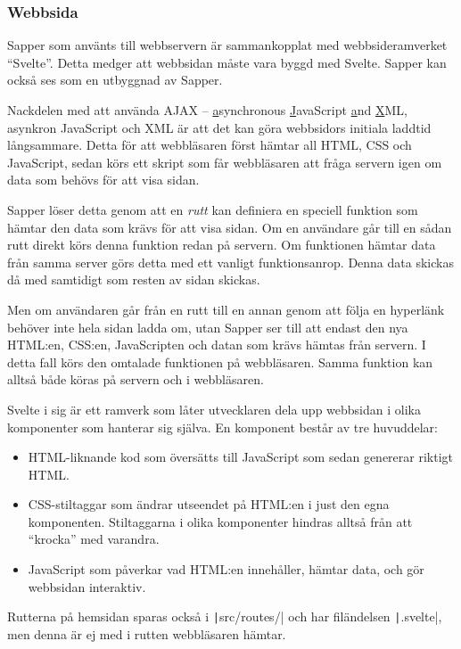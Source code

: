 \documentclass{article}
\begin{document}
\subsubsection{Webbsida}

Sapper som använts till webbservern är sammankopplat med webbsideramverket
``Svelte''. Detta medger att webbsidan måste vara byggd med Svelte. Sapper kan
också ses som en utbyggnad av Sapper.

Nackdelen med att använda AJAX \--- \underline{a}synchronous
\underline{J}avaScript \underline{a}nd \underline{X}ML, asynkron JavaScript och
XML är att det kan göra webbsidors initiala laddtid långsammare. Detta för att
webbläsaren först hämtar all HTML, CSS och JavaScript, sedan körs ett skript som
får webbläsaren att fråga servern igen om data som behövs för att visa sidan.

Sapper löser detta genom att en \textit{rutt} kan definiera en speciell funktion
som hämtar den data som krävs för att visa sidan. Om en användare går till en
sådan rutt direkt körs denna funktion redan på servern. Om funktionen hämtar
data från samma server görs detta med ett vanligt funktionsanrop. Denna data
skickas då med samtidigt som resten av sidan skickas.

Men om användaren går från en rutt till en annan genom att följa en hyperlänk
behöver inte hela sidan ladda om, utan Sapper ser till att endast den nya
HTML:en, CSS:en, JavaScripten och datan som krävs hämtas från servern. I detta
fall körs den omtalade funktionen på webbläsaren. Samma funktion kan alltså både
köras på servern och i webbläsaren.

Svelte i sig är ett ramverk som låter utvecklaren dela upp webbsidan i olika
komponenter som hanterar sig själva. En komponent består av tre huvuddelar:

\begin{itemize}
	\item HTML-liknande kod som översätts till JavaScript som sedan genererar
		riktigt HTML.
	\item CSS-stiltaggar som ändrar utseendet på HTML:en i just den egna
		komponenten. Stiltaggarna i olika komponenter hindras alltså från att
		``krocka'' med varandra.
	\item JavaScript som påverkar vad HTML:en innehåller, hämtar data, och gör
		webbsidan interaktiv.
\end{itemize}

Rutterna på hemsidan sparas också i \texttt|src/routes/|
och har filändelsen \texttt|.svelte|, men denna är ej
med i rutten webbläsaren hämtar.
\end{document}
